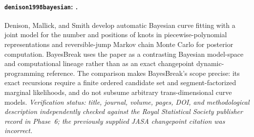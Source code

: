 \paragraph{\texttt{denison1998bayesian}: \citet{denison1998bayesian}.}
Denison, Mallick, and Smith develop automatic Bayesian curve fitting with a joint model for the number and positions of knots in piecewise-polynomial representations and reversible-jump Markov chain Monte Carlo for posterior computation. BayesBreak uses the paper as a contrasting Bayesian model-space and computational lineage rather than as an exact changepoint dynamic-programming reference. The comparison makes BayesBreak's scope precise: its exact recursions require a finite ordered candidate set and segment-factorized marginal likelihoods, and do not subsume arbitrary trans-dimensional curve models. \textit{Verification status: title, journal, volume, pages, DOI, and methodological description independently checked against the Royal Statistical Society publisher record in Phase~6; the previously supplied JASA changepoint citation was incorrect.}
